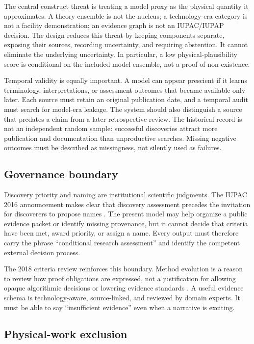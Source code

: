 \documentclass[conference]{IEEEtran}
\begin{document}
The central construct threat is treating a model proxy as the physical quantity it approximates. A theory ensemble is not the nucleus; a technology-era category is not a facility demonstration; an evidence graph is not an IUPAC/IUPAP decision. The design reduces this threat by keeping components separate, exposing their sources, recording uncertainty, and requiring abstention. It cannot eliminate the underlying uncertainty. In particular, a low physical-plausibility score is conditional on the included model ensemble, not a proof of non-existence.

Temporal validity is equally important. A model can appear prescient if it learns terminology, interpretations, or assessment outcomes that became available only later. Each source must retain an original publication date, and a temporal audit must search for model-era leakage. The system should also distinguish a source that predates a claim from a later retrospective review. The historical record is not an independent random sample: successful discoveries attract more publication and documentation than unproductive searches. Missing negative outcomes must be described as missingness, not silently used as failures.

\subsection{Governance boundary}

Discovery priority and naming are institutional scientific judgments. The IUPAC 2016 announcement makes clear that discovery assessment precedes the invitation for discoverers to propose names \cite{iupac2016}. The present model may help organize a public evidence packet or identify missing provenance, but it cannot decide that criteria have been met, award priority, or assign a name. Every output must therefore carry the phrase ``conditional research assessment'' and identify the competent external decision process.

The 2018 criteria review reinforces this boundary. Method evolution is a reason to review how proof obligations are expressed, not a justification for allowing opaque algorithmic decisions or lowering evidence standards \cite{iupac2018}. A useful evidence schema is technology-aware, source-linked, and reviewed by domain experts. It must be able to say ``insufficient evidence'' even when a narrative is exciting.

\subsection{Physical-work exclusion}
\end{document}
